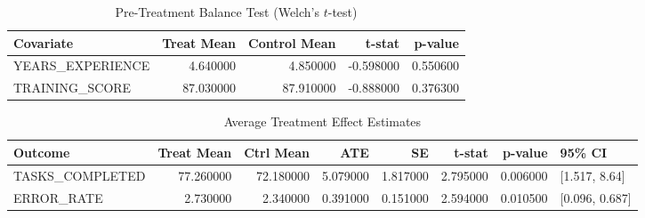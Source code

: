\begin{table}[H]
\caption{Pre-Treatment Balance Test (Welch's $t$-test)}
\label{tab:balance}
\begin{tabular}{lrrrr}
\toprule
Covariate & Treat Mean & Control Mean & t-stat & p-value \\
\midrule
YEARS\_EXPERIENCE & 4.640000 & 4.850000 & -0.598000 & 0.550600 \\
TRAINING\_SCORE & 87.030000 & 87.910000 & -0.888000 & 0.376300 \\
\bottomrule
\end{tabular}
\end{table}


\begin{table}[H]
\caption{Average Treatment Effect Estimates}
\label{tab:ate}
\begin{tabular}{lrrrrrrl}
\toprule
Outcome & Treat Mean & Ctrl Mean & ATE & SE & t-stat & p-value & 95\% CI \\
\midrule
TASKS\_COMPLETED & 77.260000 & 72.180000 & 5.079000 & 1.817000 & 2.795000 & 0.006000 & [1.517, 8.64] \\
ERROR\_RATE & 2.730000 & 2.340000 & 0.391000 & 0.151000 & 2.594000 & 0.010500 & [0.096, 0.687] \\
\bottomrule
\end{tabular}
\end{table}
